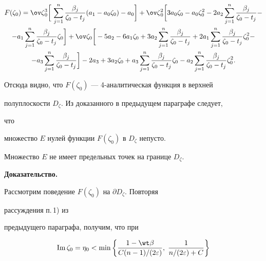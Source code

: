 \begin{multline*} 


F(\zeta_0)=\ov\zeta{}^3_0\bigg[\,\sum^n_{j=1} 


\frac{\beta_j}{\zeta_0-t_j}(a_1-a_0\zeta_0)-a_0\bigg]+ 


\ov\zeta{}^2_0\bigg[3a_0\zeta_0-a_0\zeta^2_0-2a_2 


\sum^n_{j=1}\frac{\beta_j}{\zeta_0-t_j}- \\ 


% 


-a_1\sum^n_{j=1}\frac{\beta_j}{\zeta_0-t_j}\zeta_0\bigg] 


+\ov\zeta_0\bigg[-5a_2-6a_1\zeta_0+3a_2\sum^n_{j=1} 


\frac{\beta_j}{\zeta_0-t_j}+2a_1\sum^n_{j=1} 


\frac{\beta_j}{\zeta_0-t_j}\zeta^2_0- \\ 


% 


-a_3\sum^n_{j=1}\frac{\beta_j}{\zeta_0-t_j}\bigg] 


-2a_3+3a_2\zeta_0+a_3\sum^n_{j=1}\frac{\beta_j}{\zeta_0-t_j} 


\zeta_0-a_2\sum^n_{j=1}\frac{\beta_j}{\zeta_0-t_j}\zeta^2_0. 


\end{multline*} 


Отсюда видно, что $F(\zeta_0)$ --- 4-аналитическая функция в верхней 


полуплоскости $D_\zeta$. Из доказанного в предыдущем параграфе следует, 


что 


множество $E$ нулей функции $F(\zeta_0)$ в $D_\zeta$ непусто. 


 


\begin{lemnonum} 


Множество $E$ не имеет предельных точек на границе $D_\zeta$. 


\end{lemnonum} 


 


{\bf Доказательство.}


Рассмотрим поведение $F(\zeta_0)$ на $\partial D_\zeta$. Повторяя 


рассуждения п.\,1) из 


предыдущего параграфа, получим, что при 


\begin{equation} 


\im\zeta_0=\eta_0<\min\bigg\{\frac{1-\wt\beta} 


{C(n-1)/(2\varepsilon)},\; \frac{1}{n/(2\varepsilon)+C}\bigg\} 


\end{equation} 


